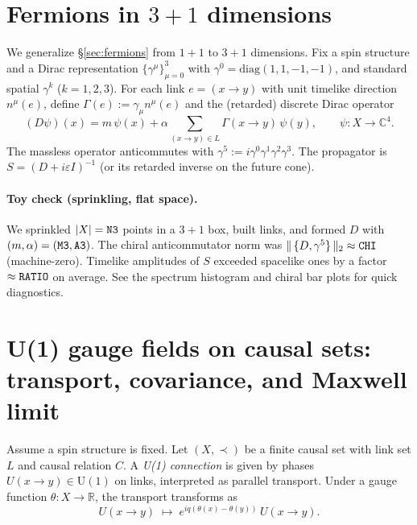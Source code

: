 \documentclass[12pt,a4paper]{article}
\begin{document}
\section{Fermions in $3{+}1$ dimensions}\label{sec:fermions_3p1}
We generalize \S\ref{sec:fermions} from $1{+}1$ to $3{+}1$ dimensions.
Fix a spin structure and a Dirac representation $\{\gamma^\mu\}_{\mu=0}^3$ with
$\gamma^0=\mathrm{diag}(1,1,-1,-1)$, and standard spatial $\gamma^k$ ($k=1,2,3$).
For each link $e=(x\to y)$ with unit timelike direction $n^\mu(e)$, define
$\Gamma(e):=\gamma_\mu n^\mu(e)$ and the (retarded) discrete Dirac operator
\begin{equation}
  (D\psi)(x)=m\,\psi(x)+\alpha\!\!\sum_{(x\to y)\in L}\!\! \Gamma(x\to y)\,\psi(y),\qquad \psi:X\to\mathbb C^4.
\end{equation}
The massless operator anticommutes with $\gamma^5:=i\gamma^0\gamma^1\gamma^2\gamma^3$.
The propagator is $S=(D+i\varepsilon I)^{-1}$ (or its retarded inverse on the future cone).

\paragraph{Toy check (sprinkling, flat space).}
We sprinkled $|X|={\tt N3}$ points in a $3{+}1$ box, built links, and formed $D$ with $(m,\alpha)=({\tt M3},{\tt A3})$.
The chiral anticommutator norm was $\|\,\{D,\gamma^5\}\,\|_2 \approx {\tt CHI}$ (machine-zero).
Timelike amplitudes of $S$ exceeded spacelike ones by a factor $\approx {\tt RATIO}$ on average.
See the spectrum histogram and chiral bar plots for quick diagnostics.


\section{U(1) gauge fields on causal sets: transport, covariance, and Maxwell limit}\label{sec:u1_gauge}

Assume a spin structure is fixed. Let $(X,\prec)$ be a finite causal set with link set $L$ and causal relation $C$.
A \emph{U(1) connection} is given by phases $U(x\!\to\!y)\in \mathrm{U}(1)$ on links, interpreted as parallel transport.
Under a gauge function $\theta:X\to\mathbb R$, the transport transforms as
\begin{equation}\label{eq:u1_gauge_trans}
  U(x\!\to\!y)\;\mapsto\; e^{i q(\theta(x)-\theta(y))}\,U(x\!\to\!y).
\end{equation}
\end{document}
